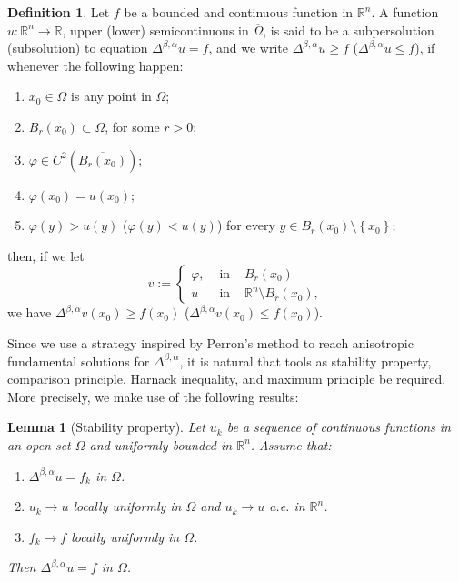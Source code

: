 \documentclass[10pt, leqno]{article}
\newtheorem{lemma}[theorem]{Lemma}
\theoremstyle{definition}
\newtheorem{definition}[theorem]{Definition}
\theoremstyle{remark}
\numberwithin{equation}{section}
\begin{document}
\begin{definition}
Let $f$ be a bounded and continuous function in $\mathbb{R}^{n}$. A function $u:\mathbb{R}^{n} \rightarrow \mathbb{R}$, upper (lower) semicontinuous in $\overline{\Omega}$, is said to be a subpersolution (subsolution) to equation $\Delta^{\beta, \alpha}u = f$, and we write $\Delta^{\beta, \alpha}u \geq f$ ($\Delta^{\beta, \alpha}u \leq f$), if whenever the following happen:
\begin{enumerate}
\item $x_{0} \in \Omega$ is any point in $\Omega$;
\medskip
\item $B_{r}\left( x_{0} \right) \subset \Omega$, for some $r>0$;
\medskip
\item $\varphi \in C^{2}\left(\overline{B_{r}\left( x_{0} \right)} \right)$;
\medskip
\item $\varphi \left( x_{0} \right) = u\left( x_{0} \right)$;
\medskip
\item $\varphi \left( y \right) > u\left( y \right)$ ($\varphi \left( y \right) < u\left( y \right)$) for every $y \in B_{r}\left( x_{0} \right) \setminus \left\lbrace x_{0} \right\rbrace$;
\end{enumerate}
then, if we let
$$
v := \left \{
\begin{array}{lll}
\varphi , & \text{ in } & B_{r}\left( x_{0} \right) \\
u & \text{ in } & \mathbb{R}^{n} \setminus  B_{r}\left( x_{0} \right),
\end{array}
\right.
$$
we have $\Delta^{\beta, \alpha}v\left( x_{0} \right) \geq f\left( x_{0} \right)$ ($\Delta^{\beta, \alpha}v\left( x_{0} \right) \leq f\left( x_{0} \right)$).
\end{definition}

Since we use a strategy inspired by Perron's method to reach anisotropic fundamental solutions for $\Delta^{\beta, \alpha}$, it is natural that tools as stability property, comparison principle, Harnack inequality, and maximum principle be required. More precisely, we make use of the following results:

\begin{lemma}[Stability property]
\label{stability prop}
Let $u_{k}$ be a sequence of continuous functions in an open set $\Omega$ and uniformly bounded in $\mathbb{R}^{n}$. Assume that:
\begin{enumerate}
\item $\Delta^{\beta, \alpha}u = f_{k}$ in $\Omega$.
\item $u_{k} \rightarrow u$ locally uniformly in $\Omega$ and $u_{k} \rightarrow u$ a.e. in $\mathbb{R}^{n}$.
\item $f_{k} \rightarrow f$ locally uniformly in $\Omega$.
\end{enumerate}
Then $\Delta^{\beta, \alpha}u = f$ in $\Omega$.
\end{lemma}
\end{document}
